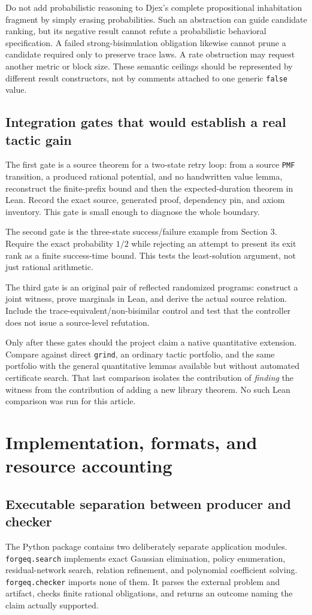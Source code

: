 \documentclass[11pt,letterpaper]{article}
\theoremstyle{definition}\newtheorem{definition}[theorem]{Definition}
\theoremstyle{remark}\newtheorem{remark}[theorem]{Remark}
\newcommand{\code}[1]{\texttt{#1}}
\begin{document}
Do not add probabilistic reasoning to Djex's complete propositional inhabitation fragment by simply erasing probabilities. Such an abstraction can guide candidate ranking, but its negative result cannot refute a probabilistic behavioral specification. A failed strong-bisimulation obligation likewise cannot prune a candidate required only to preserve trace laws. A rate obstruction may request another metric or block size. These semantic ceilings should be represented by different result constructors, not by comments attached to one generic \code{false} value.

\subsection{Integration gates that would establish a real tactic gain}
The first gate is a source theorem for a two-state retry loop: from a source \code{PMF} transition, a produced rational potential, and no handwritten value lemma, reconstruct the finite-prefix bound and then the expected-duration theorem in Lean. Record the exact source, generated proof, dependency pin, and axiom inventory. This gate is small enough to diagnose the whole boundary.

The second gate is the three-state success/failure example from Section 3. Require the exact probability $1/2$ while rejecting an attempt to present its exit rank as a finite success-time bound. This tests the least-solution argument, not just rational arithmetic.

The third gate is an original pair of reflected randomized programs: construct a joint witness, prove marginals in Lean, and derive the actual source relation. Include the trace-equivalent/non-bisimilar control and test that the controller does not issue a source-level refutation.

Only after these gates should the project claim a native quantitative extension. Compare against direct \code{grind}, an ordinary tactic portfolio, and the same portfolio with the general quantitative lemmas available but without automated certificate search. That last comparison isolates the contribution of \emph{finding} the witness from the contribution of adding a new library theorem. No such Lean comparison was run for this article.

\section{Implementation, formats, and resource accounting}
\subsection{Executable separation between producer and checker}
The Python package contains two deliberately separate application modules. \code{forgeq.search} implements exact Gaussian elimination, policy enumeration, residual-network search, relation refinement, and polynomial coefficient solving. \code{forgeq.checker} imports none of them. It parses the external problem and artifact, checks finite rational obligations, and returns an outcome naming the claim actually supported.
\end{document}
